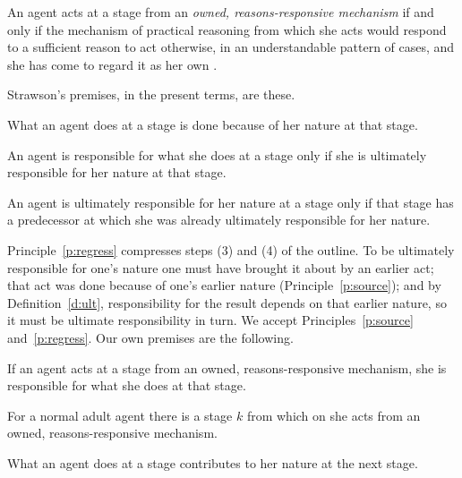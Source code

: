 \documentclass{situationist-preprint}
\begin{document}
\begin{definition}\label{d:rr}
An agent acts at a stage from an \emph{owned, reasons-responsive mechanism} if and only if the mechanism of practical reasoning from which she acts would respond to a sufficient reason to act otherwise, in an understandable pattern of cases, and she has come to regard it as her own \citep{FischerRavizza1998}.
\end{definition}

Strawson's premises, in the present terms, are these.

\begin{principle}\label{p:source}
What an agent does at a stage is done because of her nature at that stage.
\end{principle}

\begin{principle}\label{p:ult}
An agent is responsible for what she does at a stage only if she is ultimately responsible for her nature at that stage.
\end{principle}

\begin{principle}\label{p:regress}
An agent is ultimately responsible for her nature at a stage only if that stage has a predecessor at which she was already ultimately responsible for her nature.
\end{principle}

Principle~\ref{p:regress} compresses steps (3) and (4) of the outline. To be ultimately responsible for one's nature one must have brought it about by an earlier act; that act was done because of one's earlier nature (Principle~\ref{p:source}); and by Definition~\ref{d:ult}, responsibility for the result depends on that earlier nature, so it must be ultimate responsibility in turn. We accept Principles~\ref{p:source} and~\ref{p:regress}. Our own premises are the following.

\begin{assumption}\label{a:suff}
If an agent acts at a stage from an owned, reasons-responsive mechanism, she is responsible for what she does at that stage.
\end{assumption}

\begin{assumption}\label{a:mature}
For a normal adult agent there is a stage $k$ from which on she acts from an owned, reasons-responsive mechanism.
\end{assumption}

\begin{assumption}\label{a:sediment}
What an agent does at a stage contributes to her nature at the next stage.
\end{assumption}
\end{document}
